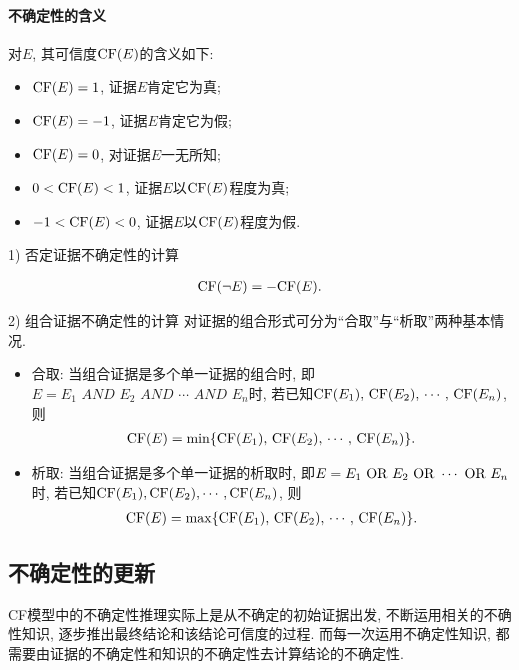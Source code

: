 \paragraph{不确定性的含义}
对$E$, 其可信度$\textup{CF}(E)$的含义如下:
\begin{itemize}
    \item $\textup{CF}(E)=1$, 证据$E$肯定它为真;
    \item $\textup{CF}(E)=-1$, 证据$E$肯定它为假;
    \item $\textup{CF}(E)=0$, 对证据$E$一无所知;
    \item $0<\textup{CF}(E)<1$, 证据$E$以$\textup{CF}(E)$程度为真;
    \item $-1<\textup{CF}(E)<0$, 证据$E$以$\textup{CF}(E)$程度为假.
\end{itemize}

1) 否定证据不确定性的计算

\begin{align}
    \textup{CF}(\neg E)=-\textup{CF}(E).
\end{align}

2) 组合证据不确定性的计算
对证据的组合形式可分为“合取”与“析取”两种基本情况.
\begin{itemize}
    \item 合取: 当组合证据是多个单一证据的组合时, 即 $E=E_1\,\,  AND\,\,    E_2\,\,    AND \,\,   \cdots\,\,     AND \,\,   E_n$时, 若已知$\textup{CF}(E_1),\, \textup{CF}(E_2),\, \cdots,\, \textup{CF}(E_n)$, 则
    \begin{align}
        \textup{CF}(E)=\min\{\textup{CF}(E_1),\, \textup{CF}(E_2),\, \cdots ,\,\textup{CF}(E_n)\}.
    \end{align}
    \item 析取: 当组合证据是多个单一证据的析取时, 即$E=E_1\,\,  \textup{OR}\,\,  E_2 \,\, \textup{OR}\,\,  \cdots \,\,  \textup{OR}\,\, E_n$时, 若已知$\textup{CF}(E_1), \textup{CF}(E_2), \cdots , \textup{CF}(E_n)$, 则
    \begin{align}
        \textup{CF}(E)=\max\{\textup{CF}(E_1),\, \textup{CF}(E_2),\, \cdots ,\,\textup{CF}(E_n)\}.
    \end{align}
\end{itemize}

\subsection{不确定性的更新}
CF模型中的不确定性推理实际上是从不确定的初始证据出发, 不断运用相关的不确性知识, 逐步推出最终结论和该结论可信度的过程.
而每一次运用不确定性知识, 都需要由证据的不确定性和知识的不确定性去计算结论的不确定性.

